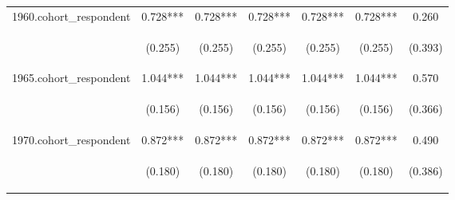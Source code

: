 \begin{center}
\begin{tabular}{lcccccc}
1960.cohort\_respondent & 0.728*** & 0.728*** & 0.728*** & 0.728*** & 0.728*** & 0.260 \\
\vspace{4pt} & \begin{footnotesize}(0.255)\end{footnotesize} & \begin{footnotesize}(0.255)\end{footnotesize} & \begin{footnotesize}(0.255)\end{footnotesize} & \begin{footnotesize}(0.255)\end{footnotesize} & \begin{footnotesize}(0.255)\end{footnotesize} & \begin{footnotesize}(0.393)\end{footnotesize} \\
1965.cohort\_respondent & 1.044*** & 1.044*** & 1.044*** & 1.044*** & 1.044*** & 0.570 \\
\vspace{4pt} & \begin{footnotesize}(0.156)\end{footnotesize} & \begin{footnotesize}(0.156)\end{footnotesize} & \begin{footnotesize}(0.156)\end{footnotesize} & \begin{footnotesize}(0.156)\end{footnotesize} & \begin{footnotesize}(0.156)\end{footnotesize} & \begin{footnotesize}(0.366)\end{footnotesize} \\
1970.cohort\_respondent & 0.872*** & 0.872*** & 0.872*** & 0.872*** & 0.872*** & 0.490 \\
\vspace{4pt} & \begin{footnotesize}(0.180)\end{footnotesize} & \begin{footnotesize}(0.180)\end{footnotesize} & \begin{footnotesize}(0.180)\end{footnotesize} & \begin{footnotesize}(0.180)\end{footnotesize} & \begin{footnotesize}(0.180)\end{footnotesize} & \begin{footnotesize}(0.386)\end{footnotesize} \\

\end{tabular}
\end{center}
